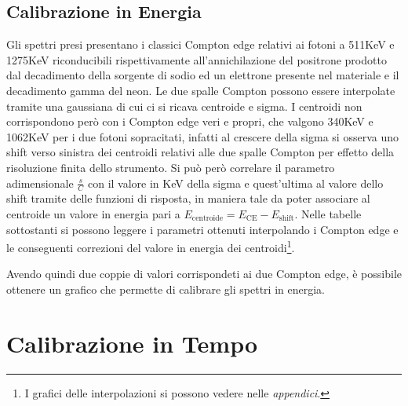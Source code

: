 \subsection{Calibrazione in Energia}
Gli spettri presi presentano i classici Compton edge relativi ai fotoni a 511KeV e 1275KeV riconducibili rispettivamente
all'annichilazione del positrone prodotto dal decadimento della sorgente di sodio ed un elettrone presente nel materiale e il decadimento gamma del neon. Le due spalle Compton possono
essere interpolate tramite una gaussiana di cui ci si ricava centroide e sigma. I centroidi non corrispondono però con i Compton edge veri e propri, che valgono
340KeV e 1062KeV per i due fotoni sopracitati, infatti al crescere della sigma si osserva uno shift verso sinistra dei centroidi relativi alle due spalle Compton
per effetto della risoluzione finita dello strumento.
Si può però correlare il parametro adimensionale \(\frac{s}{C}\) con il valore in KeV della sigma e quest'ultima al valore dello shift tramite delle funzioni di 
risposta, in maniera tale da poter associare al centroide un valore in energia pari a \(E_{\text{centroide}} = E_{\text{CE}} - E_{\text{shift}}\).  Nelle tabelle
sottostanti si possono leggere i parametri ottenuti interpolando i Compton edge e le conseguenti correzioni del valore in energia dei centroidi\footnote{I grafici
delle interpolazioni si possono vedere nelle \textit{appendici}.}.


%
\begin{tabella}[h]
	\centering
	
	\caption{Procedura calibrazione del rivelatore 1}
	\label{tab:calib_shift_1}
\end{tabella}
%
%
\begin{tabella}[h]
	\centering
	
	\caption{Procedura calibrazione del rivelatore 2}
	\label{tab:calib__shift_2}
\end{tabella}
%
Avendo quindi due coppie di valori corrispondeti ai due Compton edge, è possibile ottenere un grafico che permette di calibrare gli spettri in energia.



\section{Calibrazione in Tempo}

